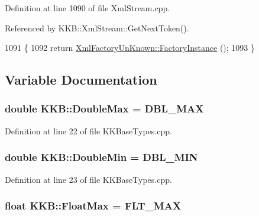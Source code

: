 Definition at line 1090 of file Xml\+Stream.\+cpp.



Referenced by K\+K\+B\+::\+Xml\+Stream\+::\+Get\+Next\+Token().


\begin{DoxyCode}
1091 \{
1092   \textcolor{keywordflow}{return}  \hyperlink{class_xml_factory_un_known_a5c66e2c26195cea8a10093e1b58189eb}{XmlFactoryUnKnown::FactoryInstance} ();
1093 \}
\end{DoxyCode}


\subsection{Variable Documentation}
\subsubsection[{\texorpdfstring{Double\+Max}{DoubleMax}}]{\setlength{\rightskip}{0pt plus 5cm}double K\+K\+B\+::\+Double\+Max = D\+B\+L\+\_\+\+M\+AX}\hypertarget{namespace_k_k_b_ad44c1392d19990e1279f4bd560df285d}{}\label{namespace_k_k_b_ad44c1392d19990e1279f4bd560df285d}


Definition at line 22 of file K\+K\+Base\+Types.\+cpp.

\subsubsection[{\texorpdfstring{Double\+Min}{DoubleMin}}]{\setlength{\rightskip}{0pt plus 5cm}double K\+K\+B\+::\+Double\+Min = D\+B\+L\+\_\+\+M\+IN}\hypertarget{namespace_k_k_b_ac986478abc5917bf650913249e2f457b}{}\label{namespace_k_k_b_ac986478abc5917bf650913249e2f457b}


Definition at line 23 of file K\+K\+Base\+Types.\+cpp.

\subsubsection[{\texorpdfstring{Float\+Max}{FloatMax}}]{\setlength{\rightskip}{0pt plus 5cm}float K\+K\+B\+::\+Float\+Max = F\+L\+T\+\_\+\+M\+AX}\hypertarget{namespace_k_k_b_ae17198c2bfe6bff1db2be8bb83f51929}{}\label{namespace_k_k_b_ae17198c2bfe6bff1db2be8bb83f51929}


